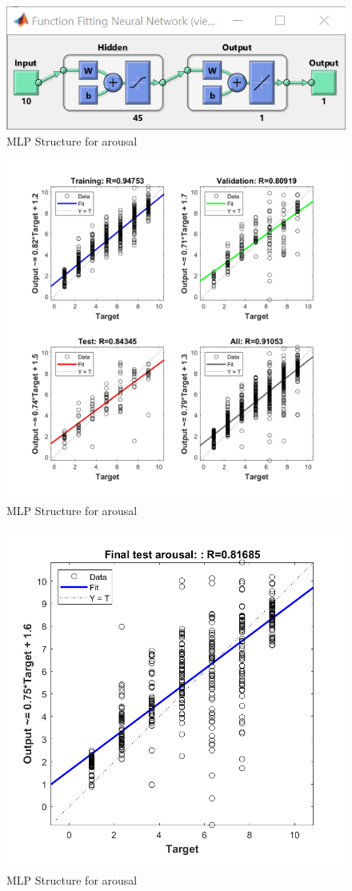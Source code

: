\begin{figure}[H]
	\centering
	\includegraphics{img/arousal_mlp_45.png} 
	\caption{MLP Structure for arousal}
\end{figure}
\begin{figure}[H]
	\centering
	\includegraphics[width=\linewidth]{img/arousal_mlp_45_regression.png} 
	\caption{MLP Structure for arousal}
\end{figure}
\begin{figure}[H]
	\centering
	\includegraphics[width=0.6\linewidth]{img/arousal_mlp_45_regression_with_testset.png} 
	\caption{MLP Structure for arousal}
\end{figure}
